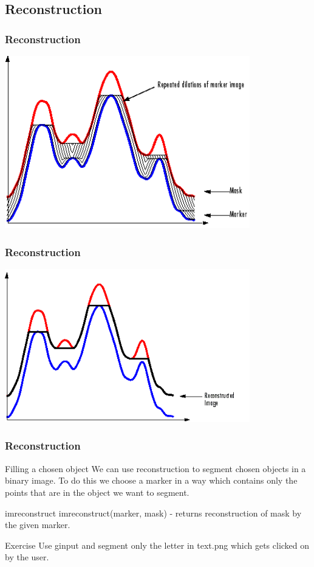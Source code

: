 \documentclass{beamer}
\begin{document}
\subsection{Reconstruction}

\begin{frame}
\frametitle{Reconstruction}
\begin{center}
\includegraphics[width= 0.8\textwidth]{recon.png}
\end{center}
\end{frame}


\begin{frame}
\frametitle{Reconstruction}
\begin{center}
\includegraphics[width= 0.8\textwidth]{recon2.png}
\end{center}
\end{frame}

\begin{frame}
\frametitle{Reconstruction}

  \begin{block}{Filling a chosen object}
  We can use reconstruction to segment chosen objects in a binary image. To do this we choose a marker in a way which contains only the points that are in the object we want to segment.

  \end{block}  
  
  \begin{block}{imreconstruct}
  imreconstruct(marker, mask) - returns reconstruction of mask by the given marker.
  \end{block}  
  
  \begin{block}{Exercise}
  Use ginput and segment only the letter in text.png which gets clicked on by the user.
  \end{block}  
\end{frame}
\end{document}
